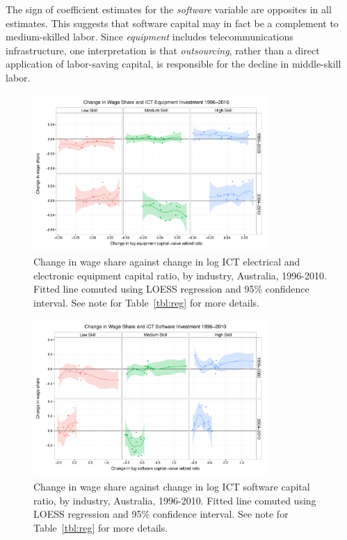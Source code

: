 The sign of coefficient estimates for the {\em software} variable are opposites in all estimates. This suggests that software capital may in fact be a complement to medium-skilled labor. Since {\em equipment} includes telecommunications infrastructure, one interpretation is that {\em outsourcing}, rather than a direct application of labor-saving capital, is responsible for the decline in middle-skill labor.

\begin{figure}
  \centering
\includegraphics[width=0.8\textwidth]{../figure/wage_share_equipment_skill_split.pdf}
  \caption{Change in wage share against change in log ICT electrical and electronic equipment capital ratio, by industry, Australia, 1996-2010.
    Fitted line comuted using LOESS regression and 95\% confidence interval. See note for Table~\ref{tbl:reg} for more details.
  }
  \label{fig:equip}
\end{figure}

\begin{figure}
  \centering
  \includegraphics[width=0.8\textwidth]{../figure/wage_share_software_skill_split.pdf}
  \caption{Change in wage share against change in log ICT software capital ratio, by industry, Australia, 1996-2010. Fitted line comuted using LOESS regression and 95\% confidence interval.
    See note for Table~\ref{tbl:reg} for more details.
  }
  \label{fig:soft}
\end{figure}

